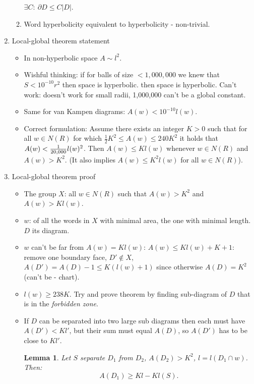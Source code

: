 \documentclass[11pt]{article} \usepackage{amssymb}
\newtheorem{lemma}[theorem]{Lemma}
\newcommand{\half}{{\textstyle \frac12}}
\begin{document}
\begin{enumerate}
\begin{enumerate}
    $\exists C:\: \partial D\leq C|D|$.
  \item Word hyperbolicity equivalent to hyperbolicity - non-trivial.
  \end{enumerate}
  \item Local-global theorem statement
    \begin{itemize}
    \item In non-hyperbolic space $A\sim l^2$. 
    \item Wishful thinking: if for balls of size $< 1,000,000$
      we knew that $S<10^{-10} r^2$ then space is hyperbolic. 
      then space is hyperbolic. Can't work: doesn't work for small radii,
      1,000,000 can't be a global constant.
    \item Same for van Kampen diagrams: $A(w)<10^{-10}l(w)$.
    \item Correct formulation: Assume there exists an integer $K>0$ such that
      for all $w\in N(R)$ for which $\half K^2\leq A(w)\leq 240K^2$ it holds that
      $A(w)<{1\over 20,000}l(w)^2$. Then $A(w)\leq Kl(w)$ whenever $w\in N(R)$ and $A(w)>K^2$. 
      (It also implies
      $A(w)\leq K^2l(w)$ for all $w\in N(R)$).    
    \end{itemize}
  \item Local-global theorem proof
    \begin{itemize}
    \item The group $X$: all $w\in N(R)$ such that $A(w)>K^2$ and $A(w)>Kl(w)$.
    \item $w$: of all the words in $X$ with minimal area, the one with 
      minimal length. $D$ its diagram.
    \item $w$ can't be far from $A(w)=Kl(w)$: 
      $A(w)\leq Kl(w)+K+1$: remove one boundary face, $D'\not \in X$,
      $A(D') = A(D)-1\leq K(l(w)+1)$ since otherwise $A(D)=K^2$ (can't be - chart).
    \item $l(w)\geq 238K$. Try and prove theorem by finding sub-diagram of $D$ that
      is in the {\em forbidden zone}.
    \item If $D$ can be separated into two large sub diagrams then each
      must have $A(D')<Kl'$, but their sum must equal $A(D)$, so $A(D')$ has
      to be close to $Kl'$.
      \begin{lemma}
        Let $S$ separate $D_1$ from $D_2$, $A(D_2)>K^2$, $l=l(D_1\cap w)$. 
        Then:
        \begin{equation}
          A(D_1)\geq Kl-Kl(S).  
        \end{equation}
      \end{lemma}

\end{itemize}
\end{enumerate}
\end{document}
